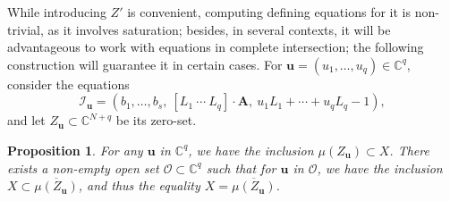 \documentclass[12pt]{article}
\def\C{\mathbb{C}}
\newtheorem{prop}[theorem]{Proposition}
\begin{document}
While introducing $Z'$ is convenient, computing defining equations for
it is non-trivial, as it involves saturation; besides, in several
contexts, it will be advantageous to work with equations in complete
intersection; the following construction will guarantee it in certain
cases. For $\bm u = (u_1,\dots,u_q) \in \C^q$, consider the equations
\[\mathscr{I}_{\bm u} = ( b_1,\dots,b_s, \  [ L_1 ~\cdots~ L_q]\cdot \bm A,\ u_1 L_1 + \cdots + u_q L_q -1 ),\]
and let $Z_{\bm u} \subset \C^{N+q}$ be its zero-set.

\begin{prop}\label{prop:projection}
  For any $\bm u$ in $\C^q$, we have the inclusion $\mu(Z_{\bm u})
  \subset X$. There exists a non-empty open set $\mathscr{O} \subset
  \C^q$ such that for $\bm u$ in $\mathscr{O}$, we have the inclusion
  $X \subset \overline{\mu(Z_{\bm u})}$, and thus the equality $X =
  \overline{\mu(Z_{\bm u})}$.
\end{prop}
\end{document}
